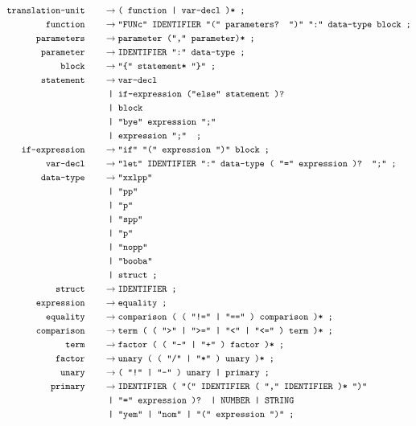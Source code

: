 \documentclass[12pt, a4paper]{article}
\newcommand{\ttt}[1]{
    \text{\texttt{#1}}
}
\newcommand{\ebnfnode}[2]{%
    #1\hspace{20px} &\to #2\ttt{ ;}\\
}
\newcommand{\ebnfnodett}[2]{%
    \ebnfnode{\ttt{#1}}{\ttt{#2}}
}
\begin{document}
    \begin{align*}
        \ebnfnodett{translation-unit}{( function | var-decl )*}
        \ebnfnodett{function}{"FUNc" IDENTIFIER "(" parameters? ")" ":" data-type block}
        \ebnfnodett{parameters}{parameter ("," parameter)*}
        \ebnfnodett{parameter}{IDENTIFIER ":" data-type}
        \ebnfnodett{block}{"\{" statement* "\}"}
        \ebnfnode{\ttt{statement}}
        {%
            \ttt{var-decl}\\
            &\ttt{ | if-expression ("else" statement )?}\\
            &\ttt{ | block }\\
            &\ttt{ | "bye" expression ";" }\\
            &\ttt{ | expression ";" }
        }
        \ebnfnodett{if-expression}{"if" "(" expression ")" block}
        \ebnfnodett{var-decl}{"let" IDENTIFIER ":" data-type ( "=" expression )? ";"}
        \ebnfnode{\ttt{data-type}}
        {%
            \ttt{"xxlpp"}\\
            &\ttt{ | "pp"}\\
            &\ttt{ | "p"}\\
            &\ttt{ | "spp"}\\
            &\ttt{ | "p"}\\
            &\ttt{ | "nopp"}\\
            &\ttt{ | "booba"}\\
            &\ttt{ | struct}
        }
        \ebnfnodett{struct}{IDENTIFIER}
        \ebnfnodett{expression}{equality}
        \ebnfnodett{equality}{comparison ( ( "!=" | "==" ) comparison )*}
        \ebnfnodett{comparison}{term ( ( ">" | ">=" | "<" | "<=" ) term )*}
        \ebnfnodett{term}{factor ( ( "-" | "+" ) factor )*}
        \ebnfnodett{factor}{unary ( ( "/" | "*" ) unary )*}
        \ebnfnodett{unary}{( "!" | "-" ) unary | primary}
        \ebnfnode{\ttt{primary}}
        {%
            \ttt{IDENTIFIER ( "(" IDENTIFIER ( "," IDENTIFIER )* ")"}\\
            &\ttt{ | "=" expression )? | NUMBER | STRING}\\
            &\ttt{ | "yem" | "nom" | "(" expression ")"}
        }
    \end{align*}
\end{document}
